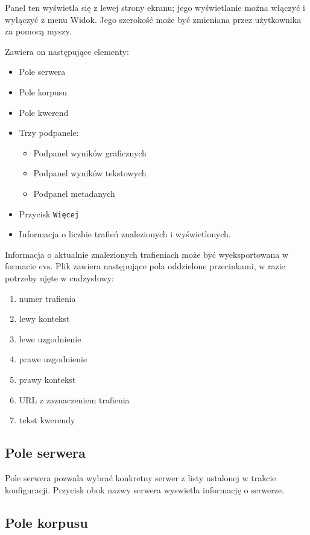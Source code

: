 \documentclass{mwart}
\begin{document}
Panel ten wyświetla się z lewej strony ekranu; jego wyświetlanie można
włączyć i wyłączyć z menu \textsf{Widok}. Jego szerokość może być
zmieniana przez użytkownika za pomocą myszy.

Zawiera on następujące elementy:
\begin{itemize}
\item Pole serwera
\item Pole korpusu
\item Pole kwerend
\item Trzy podpanele:
  \begin{itemize}
  \item Podpanel wyników graficznych
  \item Podpanel wyników tekstowych
  \item Podpanel metadanych
  \end{itemize}
\item Przycisk \texttt{Więcej}
\item Informacja o liczbie trafień znalezionych i wyświetlonych.
\end{itemize}

Informacja o aktualnie znalezionych trafieniach może być
wyeksportowana w formacie cvs. Plik zawiera następujące pola
oddzielone przecinkami, w razie potrzeby ujęte w cudzysłowy:
\begin{enumerate}
\item numer trafienia
\item lewy kontekst
\item lewe uzgodnienie
\item prawe uzgodnienie
\item prawy kontekst
\item URL z zaznaczeniem trafienia
\item tekst kwerendy
\end{enumerate}

\subsection{Pole serwera}
\label{sec:pole-serwera}

Pole serwera pozwala wybrać konkretny serwer z listy ustalonej w
trakcie konfiguracji. Przycisk obok nazwy serwera wyswietla informację
o serwerze.

\subsection{Pole korpusu}
\label{sec:pole-korpusu}
\end{document}
